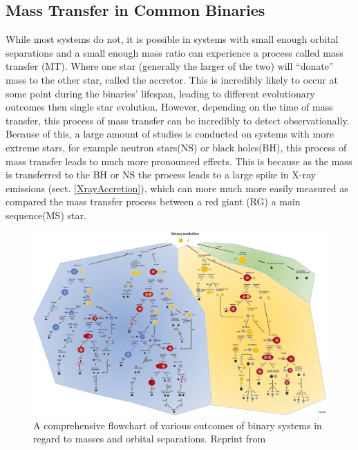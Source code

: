 \documentclass[12pt, a4paper]{article}
\begin{document}
    \subsection{Mass Transfer in Common Binaries} \label{MassTransferinCommon}
    While most systems do not, it is possible in systems with small enough orbital separations and a small enough mass ratio can experience a process called mass transfer (MT). Where one star (generally the larger of the two) will ``donate'' mass to the other star, called the accretor. This is incredibly likely to occur at some point during the binaries' lifespan, leading to different evolutionary outcomes then single star evolution. However, depending on the time of mass transfer, this process of mass transfer can be incredibly to detect observationally. Because of this, a large amount of studies is conducted on systems with more extreme stars, for example neutron stars(NS) or black holes(BH), this process of mass transfer leads to much more pronounced effects. This is because as the mass is transferred to the BH or NS the process leads to a large spike in X-ray emissions (sect. \ref{XrayAccretion}), which can more much more easily measured as compared the mass transfer process between a red giant (RG) a main sequence(MS) star.

    \vspace*{\fill}
    \begin{figure}[H]
        \centering
        \includegraphics[width=\textwidth]{figs/Binary Evolution Flowchart.jpg}
        \caption{A comprehensive flowchart of various outcomes of binary systems in regard to masses and orbital separations. Reprint from \cite{Chen_2024}}
        \label{fig:binary_evolution_flowchart}
    \end{figure}
    \vspace*{\fill}
    \restoregeometry
\end{document}
